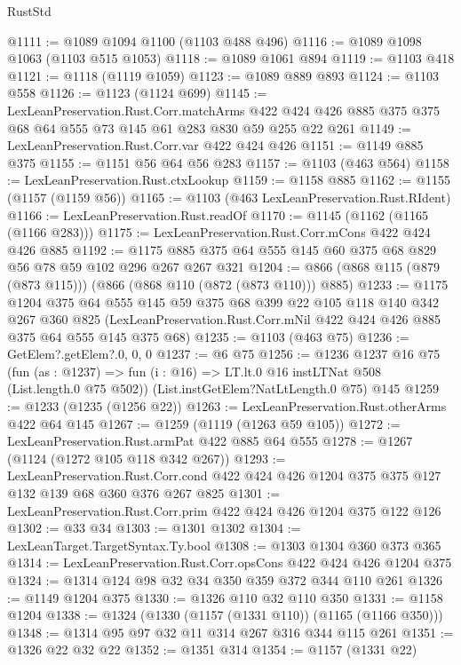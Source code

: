 \begin{lexlean}{RustStd}
\begin{coremodule}
@1111 := @1089 @1094 @1100 (@1103 @488 @496)
@1116 := @1089 @1098 @1063 (@1103 @515 @1053)
@1118 := @1089 @1061 @894
@1119 := @1103 @418
@1121 := @1118 (@1119 @1059)
@1123 := @1089 @889 @893
@1124 := @1103 @558
@1126 := @1123 (@1124 @699)
@1145 := LexLeanPreservation.Rust.Corr.matchArms
    @422
    @424
    @426
    @885
    @375
    @375
    @68
    @64
    @555
    @73
    @145
    @61
    @283
    @830
    @59
    @255
    @22
    @261
@1149 := LexLeanPreservation.Rust.Corr.var @422 @424 @426
@1151 := @1149 @885 @375
@1155 := @1151 @56 @64 @56 @283
@1157 := @1103 (@463 @564)
@1158 := LexLeanPreservation.Rust.ctxLookup
@1159 := @1158 @885
@1162 := @1155 (@1157 (@1159 @56))
@1165 := @1103 (@463 LexLeanPreservation.Rust.RIdent)
@1166 := LexLeanPreservation.Rust.readOf
@1170 := @1145 (@1162 (@1165 (@1166 @283)))
@1175 := LexLeanPreservation.Rust.Corr.mCons @422 @424 @426 @885
@1192 := @1175 @885 @375 @64 @555 @145 @60 @375 @68 @829 @56 @78 @59 @102 @296 @267 @267 @321
@1204 := @866 (@868 @115 (@879 (@873 @115))) (@866 (@868 @110 (@872 (@873 @110))) @885)
@1233 := @1175
    @1204
    @375
    @64
    @555
    @145
    @59
    @375
    @68
    @399
    @22
    @105
    @118
    @140
    @342
    @267
    @360
    @825
    (LexLeanPreservation.Rust.Corr.mNil @422 @424 @426 @885 @375 @64 @555 @145 @375 @68)
@1235 := @1103 (@463 @75)
@1236 := GetElem?.getElem?.{0, 0, 0}
@1237 := @6 @75
@1256 := @1236
    @1237
    @16
    @75
    (fun (as : @1237) => fun (i : @16) => LT.lt.{0} @16 instLTNat @508 (List.length.{0} @75 @502))
    (List.instGetElem?NatLtLength.{0} @75)
    @145
@1259 := @1233 (@1235 (@1256 @22))
@1263 := LexLeanPreservation.Rust.otherArms @422 @64 @145
@1267 := @1259 (@1119 (@1263 @59 @105))
@1272 := LexLeanPreservation.Rust.armPat @422 @885 @64 @555
@1278 := @1267 (@1124 (@1272 @105 @118 @342 @267))
@1293 := LexLeanPreservation.Rust.Corr.cond
    @422
    @424
    @426
    @1204
    @375
    @375
    @127
    @132
    @139
    @68
    @360
    @376
    @267
    @825
@1301 := LexLeanPreservation.Rust.Corr.prim @422 @424 @426 @1204 @375 @122 @126
@1302 := @33 @34
@1303 := @1301 @1302
@1304 := LexLeanTarget.TargetSyntax.Ty.bool
@1308 := @1303 @1304 @360 @373 @365
@1314 := LexLeanPreservation.Rust.Corr.opsCons @422 @424 @426 @1204 @375
@1324 := @1314 @124 @98 @32 @34 @350 @359 @372 @344 @110 @261
@1326 := @1149 @1204 @375
@1330 := @1326 @110 @32 @110 @350
@1331 := @1158 @1204
@1338 := @1324 (@1330 (@1157 (@1331 @110)) (@1165 (@1166 @350)))
@1348 := @1314 @95 @97 @32 @11 @314 @267 @316 @344 @115 @261
@1351 := @1326 @22 @32 @22
@1352 := @1351 @314
@1354 := @1157 (@1331 @22)

\end{coremodule}
\end{lexlean}
